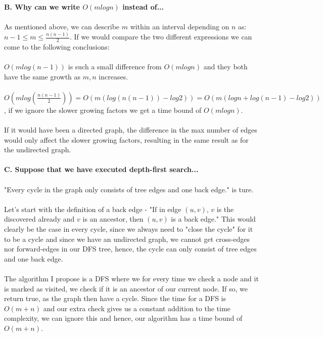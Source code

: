 \documentclass[12pt,oneside,reqno]{amsart}
\begin{document}
\textbf{B. Why can we write $O(m log n)$ instead of...}\\\\
As mentioned above, we can describe $m$ within an interval depending on $n$ as: $n-1 \leq m \leq \frac{n(n-1)}{2}$. If we would compare the two different expressions we can come to the following conclusions:\\\\
$O(mlog(n-1))$ is such a small difference from $O(mlogn)$ and they both have the same growth as $m,n$ increases.\\\\
$O(mlog(\frac{n(n-1)}{2}))=O(m(log(n(n-1))-log2))=O(m(logn+log(n-1)-log2))$, if we ignore the slower growing factors we get a time bound of $O(mlogn)$. \\\\
If it would have been a directed graph, the difference in the max number of edges would only affect the slower growing factors, resulting in the same result as for the undirected graph.\\\\

\textbf{C. Suppose that we have executed depth-first search...}\\\\
"Every cycle in the graph only consists of tree edges and one back edge." is ture.\\\\
Let's start with the definition of a back edge - "If in edge $(u,v)$, $v$ is the discovered already and $v$ is an ancestor, then $(u,v)$ is a back edge." This would clearly be the case in every cycle, since we always need to "close the cycle" for it to be a cycle and since we have an undirected graph, we cannot get cross-edges nor forward-edges in our DFS tree, hence, the cycle can only consist of tree edges and one back edge.\\\\
The algorithm I propose is a DFS where we for every time we check a node and it is marked as visited, we check if it is an ancestor of our current node. If so, we return true, as the graph then have a cycle. Since the time for a DFS is $O(m+n)$ and our extra check gives us a constant addition to the time complexity, we can ignore this and hence, our algorithm has a time bound of$O(m+n)$.
\end{document}
